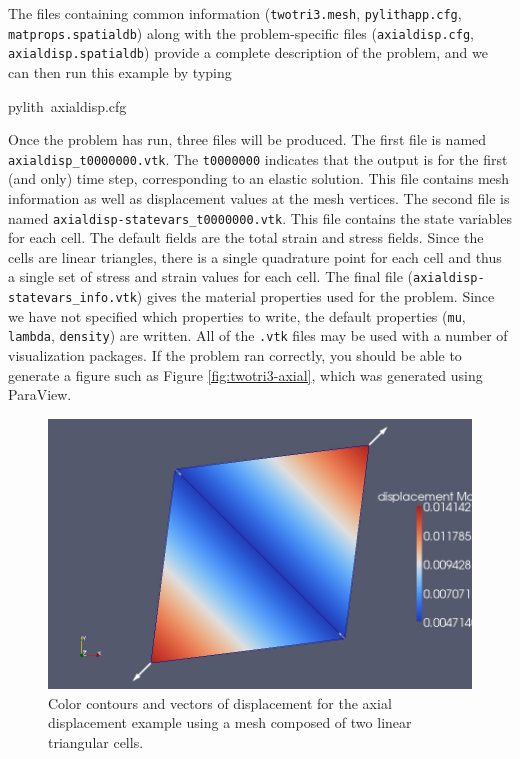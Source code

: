 The files containing common information (\texttt{twotri3.mesh}, \texttt{pylithapp.cfg},
\texttt{matprops.spatialdb}) along with the problem-specific files
(\texttt{axialdisp.cfg}, \texttt{axialdisp.spatialdb}) provide a complete
description of the problem, and we can then run this example by typing
\begin{lyxcode}
pylith~axialdisp.cfg
\end{lyxcode}
Once the problem has run, three files will be produced. The first
file is named \texttt{axialdisp\_t0000000.vtk}. The \texttt{t0000000}
indicates that the output is for the first (and only) time step, corresponding
to an elastic solution. This file contains mesh information as well
as displacement values at the mesh vertices. The second file is named
\texttt{axialdisp-statevars\_t0000000.vtk}. This file contains the
state variables for each cell. The default fields are the total strain
and stress fields. Since the cells are linear triangles, there is
a single quadrature point for each cell and thus a single set of stress
and strain values for each cell. The final file (\texttt{axialdisp-statevars\_info.vtk})
gives the material properties used for the problem. Since we have
not specified which properties to write, the default properties (\texttt{mu},
\texttt{lambda}, \texttt{density}) are written. All of the \texttt{.vtk}
files may be used with a number of visualization packages. If the
problem ran correctly, you should be able to generate a figure such
as Figure \vref{fig:twotri3-axial}, which was generated using ParaView.

\noindent \begin{center}
\begin{figure}
\begin{centering}
\includegraphics[scale=0.33]{tutorials/twocells/figs/twotri3-axialdisp}
\par\end{centering}

\caption{Color contours and vectors of displacement for the axial displacement
example using a mesh composed of two linear triangular cells.\label{fig:twotri3-axial}}
\end{figure}

\par\end{center}


